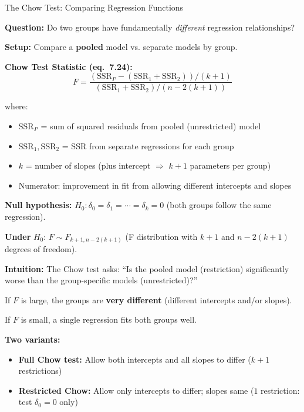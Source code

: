 \documentclass[aspectratio=169, 12pt]{beamer}
\begin{document}
\begin{frame}[shrink=25]{The Chow Test: Comparing Regression Functions}

  \textbf{Question:} Do two groups have fundamentally \textit{different} regression relationships?

  \medskip

  \textbf{Setup:} Compare a \textbf{pooled} model vs. separate models by group.

  \medskip

  \begin{highlightbox}
    \textbf{Chow Test Statistic (eq.\ 7.24):}
    \[
      F = \frac{(\text{SSR}_P - (\text{SSR}_1 + \text{SSR}_2))/(k+1)}{(\text{SSR}_1 + \text{SSR}_2)/(n - 2(k+1))}
    \]

    where:
    \begin{itemize}
      \item $\text{SSR}_P$ = sum of squared residuals from pooled (unrestricted) model
      \item $\text{SSR}_1, \text{SSR}_2$ = SSR from separate regressions for each group
      \item $k$ = number of slopes (plus intercept $\Rightarrow$ $k+1$ parameters per group)
      \item Numerator: improvement in fit from allowing different intercepts and slopes
    \end{itemize}
  \end{highlightbox}

  \medskip

  \textbf{Null hypothesis:} $H_0: \delta_0 = \delta_1 = \cdots = \delta_k = 0$ (both groups follow the same regression).

  \textbf{Under} $H_0$: $F \sim F_{k+1, n-2(k+1)}$ (F distribution with $k+1$ and $n-2(k+1)$ degrees of freedom).

  \medskip

  \begin{keybox}
    \textbf{Intuition:} The Chow test asks: ``Is the pooled model (restriction) significantly worse than the group-specific models (unrestricted)?''

    If $F$ is large, the groups are \textbf{very different} (different intercepts and/or slopes).

    If $F$ is small, a single regression fits both groups well.
  \end{keybox}

  \medskip

  \textbf{Two variants:}
  \begin{itemize}
    \item \textbf{Full Chow test:} Allow both intercepts and all slopes to differ ($k+1$ restrictions)
    \item \textbf{Restricted Chow:} Allow only intercepts to differ; slopes same ($1$ restriction: test $\delta_0 = 0$ only)
  \end{itemize}

\end{frame}
\end{document}
